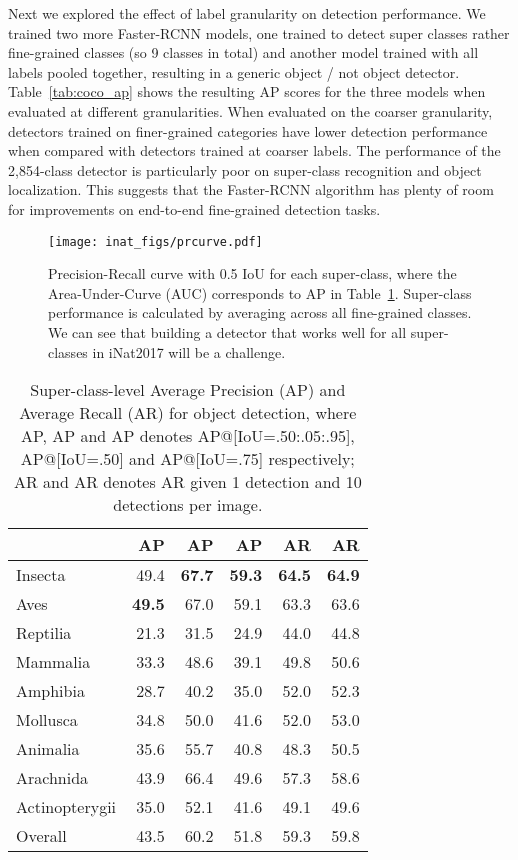 \documentclass[10pt,twocolumn,letterpaper]{article}
\begin{document}
Next we explored the effect of label granularity on detection performance. We trained two more Faster-RCNN models, one trained to detect super classes rather fine-grained classes (so 9 classes in total) and another model trained with all labels pooled together, resulting in a generic object / not object detector. Table~\ref{tab:coco_ap} shows the resulting AP scores for the three models when evaluated at different granularities. When evaluated on the coarser granularity, detectors trained on finer-grained categories have lower detection performance when compared with detectors trained at coarser labels. The performance of the 2,854-class detector is particularly poor on super-class recognition and object localization. This suggests that the Faster-RCNN algorithm has plenty of room for improvements on end-to-end fine-grained detection tasks.

\begin{figure}[t!]
\centering
\texttt{[image: inat\_figs/prcurve.pdf]}
\caption{Precision-Recall curve with 0.5 IoU for each super-class, where the Area-Under-Curve (AUC) corresponds to AP in Table~\ref{tab:ap_ar}. Super-class performance is calculated by averaging across all fine-grained classes. We can see that building a detector that works well for all super-classes in iNat2017 will be a challenge. }
\label{fig:pr_curve}
\end{figure}




\begin{table}[t]
\footnotesize
\begin{center}
\begin{tabular}{ l|r|r|r|r|r } 
 \hline
& \textbf{AP} & \textbf{AP} & \textbf{AP} & \textbf{AR} & \textbf{AR} \\ \hline
 Insecta & 49.4 & \textbf{67.7} & \textbf{59.3} & \textbf{64.5} & \textbf{64.9} \\
 Aves & \textbf{49.5} & 67.0 & 59.1 & 63.3 & 63.6 \\
 Reptilia & 21.3 & 31.5 & 24.9 & 44.0 & 44.8 \\
 Mammalia & 33.3 & 48.6 & 39.1 & 49.8 & 50.6 \\
 Amphibia & 28.7 & 40.2 & 35.0 & 52.0 & 52.3 \\
 Mollusca & 34.8 & 50.0 & 41.6 & 52.0 & 53.0 \\
 Animalia & 35.6 & 55.7 & 40.8 & 48.3 & 50.5 \\
 Arachnida & 43.9 & 66.4 & 49.6 & 57.3 & 58.6 \\
 Actinopterygii & 35.0 & 52.1 & 41.6 & 49.1 & 49.6 \\ \hline
 Overall & 43.5 & 60.2 & 51.8 & 59.3 & 59.8 \\ \hline
\end{tabular}
\end{center}
\caption{Super-class-level Average Precision (AP) and Average Recall (AR) for object detection, where AP, AP and AP denotes AP@[IoU=.50:.05:.95], AP@[IoU=.50] and AP@[IoU=.75] respectively; AR and AR denotes AR given 1 detection and 10 detections per image.}
\label{tab:ap_ar}
\end{table}
\end{document}
